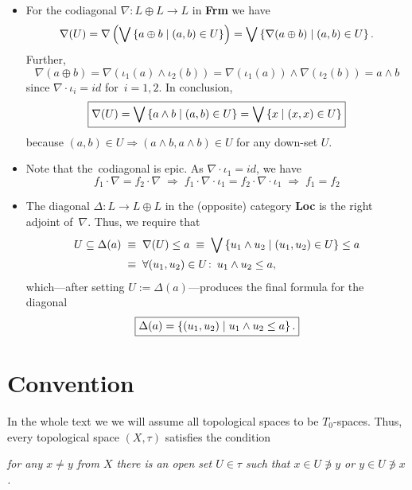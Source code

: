 \begin{itemize}
\item
{}
\label{codiag-in-Frm}
For the codiagonal $\nabla\colon L \oplus L \to L$ in {\bf Frm} we have
\[
  \nabla(U)
  = \nabla \left( \bigvee \left\{ a \oplus b \mid (a, b)\in U \right\} \right)
  = \bigvee \left\{ \nabla(a \oplus b) \mid (a, b)\in U \right\}.
\]
Further,
\[
  \nabla(a \oplus b)
  = \nabla( \iota_1(a) \wedge \iota_2(b) )
  = \nabla(\iota_1(a)) \wedge \nabla(\iota_2(b))
  = a \wedge b
\]
since $\nabla\cdot \iota_i = id$ for~$i = 1, 2$.
In conclusion,
\[
  \boxed{
    \nabla(U)
    = \bigvee \left\{ a \wedge b \mid (a, b)\in U \right\}
    = \bigvee \left\{ x \mid (x, x)\in U \right\}
  }
\]
because $(a, b)\in U \Rightarrow (a \wedge b, a \wedge b)\in U$ for any
down-set $U$.

\item Note that the~codiagonal is epic.
As $\nabla \cdot \iota_1 = id$, we have
\[
  f_1 \cdot \nabla = f_2 \cdot \nabla
  \; \Longrightarrow \;
  f_1 \cdot \nabla \cdot \iota_1 = f_2 \cdot \nabla \cdot \iota_1
  \; \Longrightarrow \;
  f_1 = f_2
\]

\item The diagonal $\Delta\colon L \to L \oplus L$ in the (opposite) category
{\bf Loc} is the right adjoint of~$\nabla$.
Thus, we require that
\begin{align*}
  U\subseteq \Delta(a)
  \; &\equiv \; \nabla(U) \le a
  \; \equiv \; \bigvee \left\{ u_1 \wedge u_2 \mid (u_1, u_2)\in U \right\} \le
  a \\
  \; &\equiv \; \forall (u_1, u_2)\in U\colon \, u_1 \wedge u_2 \le a,
\end{align*}
which---after setting $U := \Delta(a)$---produces the final formula for the
diagonal
\[
  \boxed{
    \Delta(a) = \left\{ (u_1, u_2) \mid u_1 \wedge u_2 \le a \right\}.
  }
\]
\end{itemize}

\section*{Convention}

In the whole text we we will assume all topological spaces to be $T_0$-spaces.
Thus, every topological space $(X, \tau)$ satisfies the condition
\begin{center} \it
  for any $x \ne y$ from $X$ there is an open set $U \in \tau$ such that $x \in
  U \not\owns y$ or $y \in U \not\owns x$.
\end{center}
